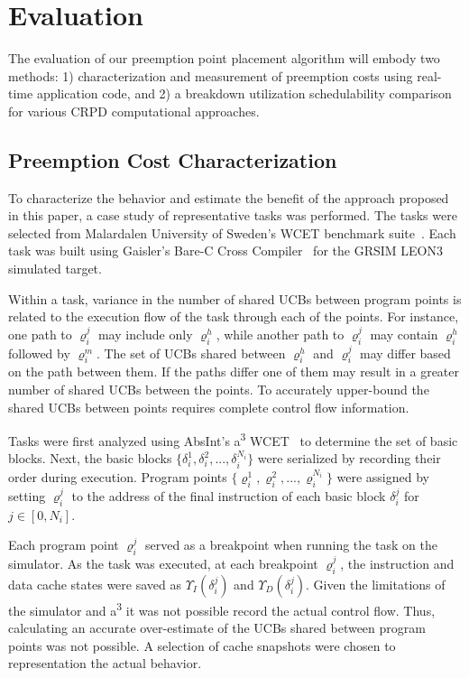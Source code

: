 \vspace{-10pt}
\section{Evaluation}\label{sec:evaluation}
The evaluation of our preemption point placement algorithm will embody
two methods: 1) characterization and measurement of preemption costs
using real-time application code, and 2) a breakdown utilization schedulability
comparison for various CRPD computational approaches.
\subsection {Preemption Cost
  Characterization}\label{sec:preemption_cost_measurement}
To characterize the behavior and estimate the benefit of the approach
proposed in this paper, a case study of representative tasks was
performed. The tasks were selected from Malardalen University of
Sweden's WCET benchmark suite~\cite{mrtc:01}. Each task was built using Gaisler's
Bare-C Cross Compiler~\cite{gaisler:01} for the GRSIM
LEON3~\cite{gaisler:02} simulated target.

Within a task, variance in the number of shared UCBs between program
points is related to the execution flow of the task through each of
the points. For instance, one path to ${\varrho_i^j}$ may include only ${\varrho_i^h}$,
while another path to ${\varrho_i^j}$ may contain ${\varrho_i^h}$ followed by
${\varrho_i^m}$. The set of UCBs shared between ${\varrho_i^h}$ and ${\varrho_i^j}$ may differ
based on the path between them. If the paths differ one of them may
result in a greater number of shared UCBs between the points. To
accurately upper-bound the shared UCBs between points requires
complete control flow information.

Tasks were first analyzed using AbsInt's a\textsuperscript{3} WCET~\cite{absint:01}
to determine the set of basic blocks. Next, the basic
blocks ${\{\delta_i^1, \delta_i^2, ..., \delta_i^{N_i}\}}$ were serialized by recording their
order during execution. Program points ${\{\varrho_i^1, \varrho_i^2, ..., \varrho_i^{N_i}\}}$ were
assigned by setting ${\varrho_i^j}$ to the address of the final instruction of
each basic block ${\delta_i^j}$ for $j \in [0, N_i]$.

Each program point ${\varrho_i^j}$ served as a breakpoint when running the
task on the simulator. As the task was executed, at each breakpoint
${\varrho_i^j}$, the instruction and data cache states were saved as ${\Upsilon_I(\delta_i^j)}$
and ${\Upsilon_D(\delta_i^j)}$. Given the limitations of the simulator and
a\textsuperscript{3} it was not possible record the actual control
flow. Thus, calculating an accurate over-estimate of the UCBs shared
between program points was not possible. A selection of cache
snapshots were chosen to representation the actual behavior.

